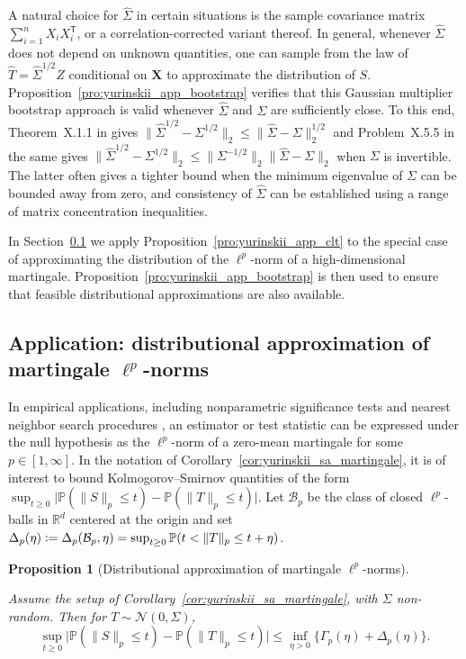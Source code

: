 \documentclass[11pt,lof]{puthesis}
\renewcommand{\P}{\ensuremath{\mathbb{P}}}
\newcommand{\R}{\ensuremath{\mathbb{R}}}
\newcommand{\bX}{\ensuremath{\mathbf{X}}}
\newcommand{\cN}{\ensuremath{\mathcal{N}}}
\newcommand{\cB}{\ensuremath{\mathcal{B}}}
\newcommand{\T}{\ensuremath{\mathsf{T}}}
\theoremstyle{break}
\newtheorem{proposition}{Proposition}[section]
\theoremstyle{proof}
\begin{document}
A natural choice for $\hat\Sigma$ in certain situations is the sample
covariance matrix $\sum_{i=1}^n X_i X_i^\T$, or a correlation-corrected variant
thereof. In general, whenever $\hat \Sigma$ does not depend on unknown
quantities, one can sample from the law of $\hat T = \hat\Sigma^{1/2} Z$
conditional on $\bX$ to approximate the distribution of $S$.
Proposition~\ref{pro:yurinskii_app_bootstrap} verifies that this Gaussian
multiplier
bootstrap approach is valid whenever $\hat\Sigma$ and $\Sigma$ are sufficiently
close. To this end, Theorem~X.1.1 in \citet{bhatia1997matrix} gives
$\big\|\hat\Sigma^{1/2} - \Sigma^{1/2}\big\|_2
\leq \big\|\hat\Sigma - \Sigma\big\|_2^{1/2}$
and Problem~X.5.5 in the same gives
$\big\|\hat\Sigma^{1/2} - \Sigma^{1/2}\big\|_2
\leq \big\|\Sigma^{-1/2}\big\|_2 \big\|\hat\Sigma - \Sigma\big\|_2$
when $\Sigma$ is invertible. The latter often gives a tighter bound when the
minimum eigenvalue of $\Sigma$ can be bounded away from zero, and consistency
of $\hat \Sigma$ can be established using a range of matrix concentration
inequalities.

In Section~\ref{sec:yurinskii_app_lp} we apply
Proposition~\ref{pro:yurinskii_app_clt} to the special case
of approximating the distribution of the $\ell^p$-norm of a high-dimensional
martingale. Proposition~\ref{pro:yurinskii_app_bootstrap} is then used to
ensure that
feasible distributional approximations are also available.

\subsection{Application: distributional approximation of martingale
\texorpdfstring{$\ell^p$}{lp}-norms}
\label{sec:yurinskii_app_lp}

In empirical applications,
including nonparametric significance tests
\citep{lopes2020bootstrapping}
and nearest neighbor search procedures
\citep{biau2015high},
an estimator or test statistic
can be expressed under the null hypothesis
as the $\ell^p$-norm of a zero-mean
martingale for some $p \in [1, \infty]$.
In the notation of Corollary~\ref{cor:yurinskii_sa_martingale},
it is of interest to bound Kolmogorov--Smirnov
quantities of the form
$\sup_{t \geq 0} \big| \P( \|S\|_p \leq t) - \P( \|T\|_p \leq t) \big|$.
Let $\cB_p$ be the class of closed $\ell^p$-balls in $\R^d$ centered at the
origin and set
$\Delta_p(\eta) \vcentcolon= \Delta_p(\cB_p, \eta)
= \sup_{t \geq 0} \P( t < \|T\|_p \leq t + \eta )$.

\begin{proposition}[Distributional approximation of
martingale $\ell^p$-norms]
\label{pro:yurinskii_app_application_lp}

Assume the setup of Corollary~\ref{cor:yurinskii_sa_martingale},
with $\Sigma$ non-random. Then for $T \sim \cN(0, \Sigma)$,
%
\begin{equation}%
\label{eq:yurinskii_app_application_lp}
\sup_{t \geq 0}
\big| \P( \|S\|_p \leq t )
- \P\left( \|T\|_p \leq t \right) \big|
\leq \inf_{\eta>0}
\big\{\Gamma_p(\eta) + \Delta_p(\eta) \big\}.
\end{equation}
%
\end{proposition}
\end{document}
